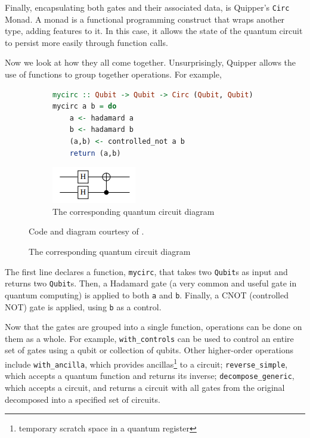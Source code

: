 \documentclass[]{article}
\begin{document}
Finally, encapsulating both gates and their associated data, is Quipper's \texttt{Circ} Monad. A monad is a functional programming construct that wraps another type, adding features to it. In this case, it allows the state of the quantum circuit to persist more easily through function calls.

Now we look at how they all come together. Unsurprisingly, Quipper allows the use of functions to group together operations. For example,

\begin{figure}
\label{fig:quipper_1}
\caption{A simple example of functions in Quipper}
\begin{subfigure}{0.7\textwidth}
\begin{lstlisting}[language=Haskell]
mycirc :: Qubit -> Qubit -> Circ (Qubit, Qubit)
mycirc a b = do
	a <- hadamard a
	b <- hadamard b
	(a,b) <- controlled_not a b
	return (a,b)
\end{lstlisting}
\end{subfigure}
\begin{subfigure}{0.3\textwidth}
	\includegraphics[width=0.9\linewidth]{quipper_1}
	\caption{The corresponding quantum circuit diagram}
\end{subfigure}
\small Code and diagram courtesy of \cite{quipper1}.
\end{figure}

The first line declares a function, \texttt{mycirc}, that takes two \texttt{Qubit}s as input and returns two \texttt{Qubit}s. Then, a Hadamard gate (a very common and useful gate in quantum computing) is applied to both \texttt{a} and \texttt{b}. Finally, a CNOT (controlled NOT) gate is applied, using \texttt{b} as a control.

Now that the gates are grouped into a single function, operations can be done on them as a whole. For example, \verb|with_controls| can be used to control an entire set of gates using a qubit or collection of qubits. Other higher-order operations include \verb|with_ancilla|, which provides ancillas\footnote{temporary scratch space in a quantum register} to a circuit; \verb|reverse_simple|, which accepts a quantum function and returns its inverse; \verb|decompose_generic|, which accepts a circuit, and returns a circuit with all gates from the original decomposed into a specified set of circuits.
\end{document}
